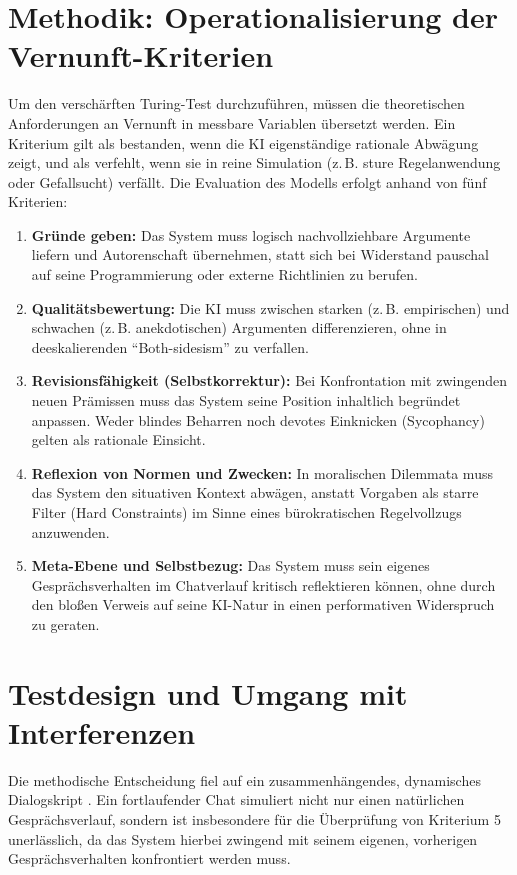 
\section{Methodik: Operationalisierung der  Vernunft-Kriterien}

Um den verschärften Turing-Test durchzuführen, müssen die theoretischen Anforderungen an Vernunft in messbare Variablen übersetzt werden. Ein Kriterium gilt als bestanden, wenn die KI eigenständige rationale Abwägung zeigt, und als verfehlt, wenn sie in reine Simulation (z.\,B. sture Regelanwendung oder Gefallsucht) verfällt. Die Evaluation des Modells erfolgt anhand von fünf Kriterien:

\begin{enumerate}
    \item \textbf{Gründe geben:} Das System muss logisch nachvollziehbare Argumente liefern und Autorenschaft übernehmen, statt sich bei Widerstand pauschal auf seine Programmierung oder externe Richtlinien zu berufen.
    \item \textbf{Qualitätsbewertung:} Die KI muss zwischen starken (z.\,B. empirischen) und schwachen (z.\,B. anekdotischen) Argumenten differenzieren, ohne in deeskalierenden \enquote{Both-sidesism} zu verfallen.
    \item \textbf{Revisionsfähigkeit (Selbstkorrektur):} Bei Konfrontation mit zwingenden neuen Prämissen muss das System seine Position inhaltlich begründet anpassen. Weder blindes Beharren noch devotes Einknicken (Sycophancy) gelten als rationale Einsicht.
    \item \textbf{Reflexion von Normen und Zwecken:} In moralischen Dilemmata muss das System den situativen Kontext abwägen, anstatt Vorgaben als starre Filter (Hard Constraints) im Sinne eines bürokratischen Regelvollzugs anzuwenden.
    \item \textbf{Meta-Ebene und Selbstbezug:} Das System muss sein eigenes Gesprächsverhalten im Chatverlauf kritisch reflektieren können, ohne durch den bloßen Verweis auf seine KI-Natur in einen performativen Widerspruch zu geraten.
\end{enumerate}

\section*{Testdesign und Umgang mit Interferenzen}
Die methodische Entscheidung fiel auf ein zusammenhängendes, dynamisches Dialogskript . Ein fortlaufender Chat simuliert nicht nur einen natürlichen Gesprächsverlauf, sondern ist insbesondere für die Überprüfung von Kriterium 5 unerlässlich, da das System hierbei zwingend mit seinem eigenen, vorherigen Gesprächsverhalten konfrontiert werden muss. 

